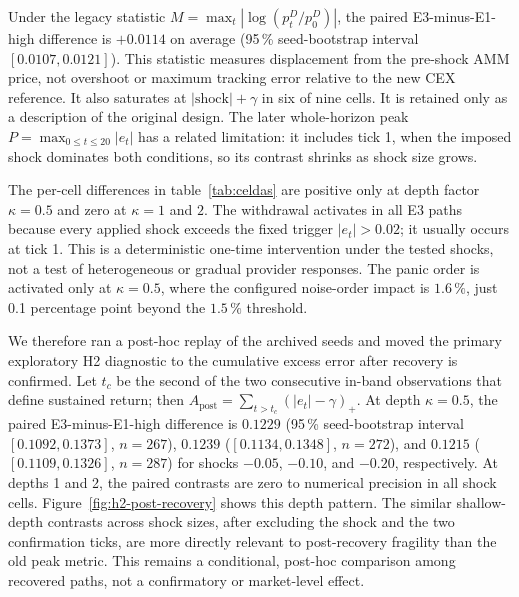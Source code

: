 Under the legacy statistic $M=\max_t|\log(p_t^D/p_0^D)|$, the paired E3-minus-E1-high difference is $+0.0114$ on average (95\,\% seed-bootstrap interval $[0.0107,0.0121]$). This statistic measures displacement from the pre-shock AMM price, not overshoot or maximum tracking error relative to the new CEX reference. It also saturates at $|\text{shock}|+\gamma$ in six of nine cells. It is retained only as a description of the original design. The later whole-horizon peak $P=\max_{0\le t\le20}|e_t|$ has a related limitation: it includes tick 1, when the imposed shock dominates both conditions, so its contrast shrinks as shock size grows.

The per-cell differences in table~\ref{tab:celdas} are positive only at depth factor $\kappa=0.5$ and zero at $\kappa=1$ and $2$. The withdrawal activates in all E3 paths because every applied shock exceeds the fixed trigger $|e_t|>0.02$; it usually occurs at tick 1. This is a deterministic one-time intervention under the tested shocks, not a test of heterogeneous or gradual provider responses. The panic order is activated only at $\kappa=0.5$, where the configured noise-order impact is $1.6\,\%$, just 0.1 percentage point beyond the $1.5\,\%$ threshold.

We therefore ran a post-hoc replay of the archived seeds and moved the primary exploratory H2 diagnostic to the cumulative excess error after recovery is confirmed. Let $t_c$ be the second of the two consecutive in-band observations that define sustained return; then $A_{\mathrm{post}}=\sum_{t>t_c}(|e_t|-\gamma)_+$. At depth $\kappa=0.5$, the paired E3-minus-E1-high difference is $0.1229$ (95\,\% seed-bootstrap interval $[0.1092,0.1373]$, $n=267$), $0.1239$ ($[0.1134,0.1348]$, $n=272$), and $0.1215$ ($[0.1109,0.1326]$, $n=287$) for shocks $-0.05$, $-0.10$, and $-0.20$, respectively. At depths 1 and 2, the paired contrasts are zero to numerical precision in all shock cells. Figure~\ref{fig:h2-post-recovery} shows this depth pattern. The similar shallow-depth contrasts across shock sizes, after excluding the shock and the two confirmation ticks, are more directly relevant to post-recovery fragility than the old peak metric. This remains a conditional, post-hoc comparison among recovered paths, not a confirmatory or market-level effect.

